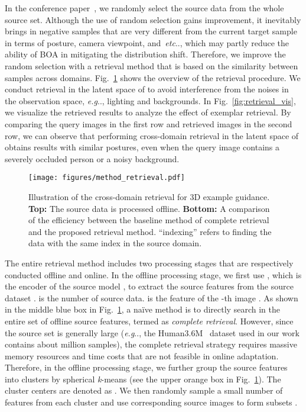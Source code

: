 \documentclass[10pt,journal,compsoc]{IEEEtran}
\makeatletter
\let\MYoriglatexcaption\caption
\renewcommand{\caption}[2][\relax]{\MYoriglatexcaption[#2]{#2}}
\DeclareRobustCommand\onedot{\futurelet\@let@token\@onedot}
\def\@onedot{\ifx\@let@token.\else.\null\fi\xspace}
\def\eg{\emph{e.g}\onedot} \def\Eg{\emph{E.g}\onedot}
\def\etc{\emph{etc}\onedot} \def\vs{\emph{vs}\onedot}
\newcommand{\fig}[1]{Fig.~\ref{#1}}
\makeatother
\begin{document}
In the conference paper~\cite{guan2021bilevel}, we randomly select the source data from the whole source set. Although the use of random selection gains improvement, it inevitably brings in negative samples that are very different from the current target sample in terms of posture, camera viewpoint, and~\etc, which may partly reduce the ability of BOA in mitigating the distribution shift.
Therefore, we improve the random selection with a retrieval method that is based on the similarity between samples across domains. 
\fig{fig:method_retrieval} shows the overview of the retrieval procedure.
We conduct retrieval in the latent space of  to avoid interference from the noises in the observation space, \eg, lighting and backgrounds.
In \fig{fig:retrieval_vis}, we visualize the retrieved results to analyze the effect of exemplar retrieval. 
By comparing the query images in the first row and retrieved images in the second row, we can observe that performing cross-domain retrieval in the latent space of  obtains results with similar postures, even when the query image contains a severely occluded person or a noisy background. 



\begin{figure}[t]
    \centering
    \texttt{[image: figures/method\_retrieval.pdf]}
    \vspace{-15pt}
    \caption{
    Illustration of the cross-domain retrieval for 3D example guidance. \textbf{Top:} The source data is processed offline. \textbf{Bottom:} A comparison of the efficiency between the baseline method of complete retrieval and the proposed retrieval method. ``indexing'' refers to finding the data with the same index in the source domain.}
\label{fig:method_retrieval}
\end{figure}



The entire retrieval method includes two processing stages that are respectively conducted offline and online. 
In the offline processing stage, we first use , which is the encoder of the source model , to extract the source features  from the source dataset . 
 is the number of source data.
 is the feature of the -th image .
As shown in the middle blue box in \fig{fig:method_retrieval}, a na\"{i}ve method is to directly search in the entire set of offline source features, termed as \textit{complete retrieval}.
However, since the source set is generally large (\eg, the Human3.6M~\cite{h36m_pami} dataset used in our work contains about  million samples), the complete retrieval strategy requires massive memory resources and time costs that are not feasible in online adaptation.
Therefore, in the offline processing stage, we further group the source features  into  clusters by spherical \textit{k}-means (see the upper orange box in \fig{fig:method_retrieval}).
The cluster centers are denoted as .
We then randomly sample a small number of features from each cluster and use corresponding source images to form  subsets .
\end{document}
